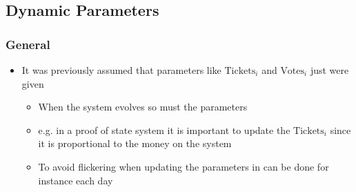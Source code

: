 \documentclass[11pt]{article}
\begin{document}
\subsection{Dynamic Parameters}
\label{sec:org260ed67}
\subsubsection{General}
\label{sec:org3c85384}
\begin{itemize}
\item It was previously assumed that parameters like \(\text{Tickets}_i\) and \(\text{Votes}_i\) just were given
\begin{itemize}
\item When the system evolves so must the parameters
\item e.g. in a proof of state system it is important to update the \(\text{Tickets}_i\) since it is proportional to the money on the system
\item To avoid flickering when updating the parameters in can be done for instance each day
\end{itemize}
\end{itemize}
\end{document}
